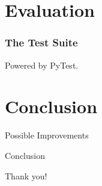 \documentclass[smaller,dvipsnames,ratio=169]{beamer}
\begin{document}
  
  \section{Evaluation}

  \begin{frame}
    \frametitle{The Test Suite}
    Powered by \alert{PyTest}.
  \end{frame}

  \section{Conclusion}

  \begin{frame}{Possible Improvements}
  \end{frame}

  \begin{frame}{Conclusion}
  \end{frame}

  \begin{frame}[standout]
    Thank you!
  \end{frame}
\end{document}
